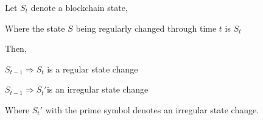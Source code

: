 \documentclass[english]{article}
\begin{document}
Let $S_{t}$ denote a blockchain state,

Where the state $S$ being regularly changed through time $t$ is
$S_{t}$

Then,

$S_{t-1}\Rightarrow S_{t}$ is a regular state change

$S_{t-1}\Rightarrow S_{t}$$'$is an irregular state change

Where $S$$_{t}$$'$ with the prime symbol denotes an irregular state
change.
\end{document}
